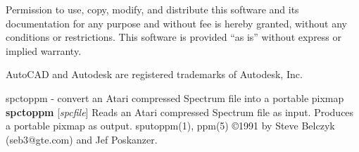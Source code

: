 \par
Permission to use, copy, modify, and distribute this software and its
documentation for any purpose and without fee is hereby granted,
without any conditions or restrictions.  This software is provided ``as
is'' without express or implied warranty.
\par
AutoCAD and Autodesk are registered trademarks of Autodesk, Inc.
%
 
%

\newpage
%

spctoppm - convert an Atari compressed Spectrum file into a portable pixmap
{\bf spctoppm}
{\rm [}{\it spcfile}{\rm ]}
Reads an Atari compressed Spectrum file as input.
Produces a portable pixmap as output.
sputoppm(1), ppm(5)
\copyright 1991 by Steve Belczyk (seb3@gte.com) and Jef Poskanzer.
%
 
%

\newpage
%

